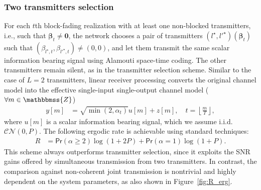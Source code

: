 \documentclass[10pt,journal,a4paper]{IEEEtran}
\renewcommand{\P}{\mathsf{Pr}} 			%
\newcommand{\stdset}[1]{\mathbbmss{#1}}	%
\renewcommand{\vec}[1]{\bm{#1}}		%
\newcommand{\CN}{\mathcal{CN}}			%
\begin{document}
\subsubsection{Two transmitters selection} For each $t$th block-fading realization with at least one non-blocked transmitters, i.e., such that $\vec{\beta}_t\neq \vec{0}$, the network chooses a pair of transmitters $(l^{\star},l'^{\star})(\vec{\beta}_t)$ such that $(\beta_{l^\star,t},\beta_{l'^\star,t})\neq (0,0)$, and let them transmit the same scalar information bearing signal using Alamouti space-time coding. The other transmitters remain silent, as in the transmitter selection scheme. Similar to the case of $L=2$ transmitters, linear receiver processing converts the original channel model into the effective single-input single-output channel model ($\forall m \in \stdset{Z}$)
\begin{align*}
y[m] &= \sqrt{\min(2,\alpha_t)}u[m]+z[m], \quad t=\left\lfloor \frac{m}{T}\right\rfloor,
\end{align*}
where $u[m]$ is a scalar information bearing signal, which we assume i.i.d. $\CN(0,P)$. The following ergodic rate is achievable using standard techniques: 
\begin{align*}
R &= \P(\alpha \geq 2)\log(1+2P) + \P(\alpha = 1)\log(1+P). 
\end{align*} 
This scheme always outperforms transmitter selection, since it exploits the SNR gains offered by simultaneous transmission from two transmitters. In contrast, the comparison against non-coherent joint transmission is nontrivial and highly dependent on the system parameters, as also shown in Figure~\ref{fig:R_erg}.
\end{document}
